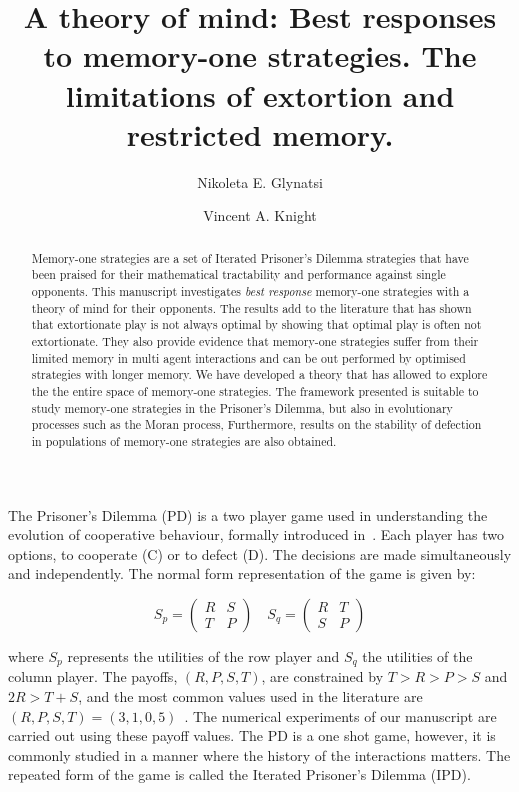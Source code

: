 \documentclass[10pt]{article}
\title{A theory of mind: Best responses to memory-one strategies. The limitations
of extortion and restricted memory.}
\author[1, *]{Nikoleta E. Glynatsi}
\author[1]{Vincent A. Knight}
\affil[1]{Cardiff University, School of Mathematics, Cardiff, United Kingdom}
\affil[*]{Corresponding author: Nikoleta E. Glynatsi, glynatsine@cardiff.ac.uk}
\date{}
\begin{document}
\maketitle

\newpage

\begin{abstract}
    Memory-one strategies are a set of Iterated Prisoner's Dilemma strategies
    that have been praised for their mathematical tractability and performance
    against single opponents. This manuscript investigates
    \textit{best response} memory-one strategies with a theory of mind for
    their opponents. The results add to the literature that has shown that
    extortionate play is not always optimal by showing that optimal play is
    often not extortionate.
    They
    also provide evidence that memory-one strategies suffer from their limited
    memory in multi agent interactions and can be out performed by
    optimised strategies with longer memory.
    We have developed a theory that has allowed to explore the the entire
    space of memory-one strategies. The framework presented is suitable to
    study memory-one strategies in the Prisoner's Dilemma, but also
    in evolutionary processes such as the Moran process,
    Furthermore, results on the stability of defection in populations of 
    memory-one strategies are also obtained.
\end{abstract}

The Prisoner's Dilemma (PD) is a two player game used in understanding the
evolution of cooperative behaviour, formally introduced in~\cite{Flood1958}.
Each player has two options, to cooperate (C) or to defect (D). The decisions
are made simultaneously and independently. The normal form representation of the
game is given by:

\begin{equation}\label{equ:pd_definition}
    S_p =
    \begin{pmatrix}
        R & S  \\
        T & P
    \end{pmatrix}
    \quad
    S_q =
    \begin{pmatrix}
        R & T  \\
        S & P
    \end{pmatrix}
\end{equation}

where \(S_p\) represents the utilities of the row player and \(S_q\) the
utilities of the column player. The payoffs, \((R, P, S, T)\), are constrained
by \(T > R > P > S\) and \(2R > T + S\), and the most common values used in the
literature are \((R, P, S, T) = (3, 1, 0, 5)\)~\cite{Axelrod1981}.
The numerical experiments of our manuscript are carried out using these
payoff values.
The PD is a one shot game, however, it is commonly studied in a manner where the
history of the interactions matters. The repeated form of the game is called the
Iterated Prisoner's Dilemma (IPD).
\end{document}
